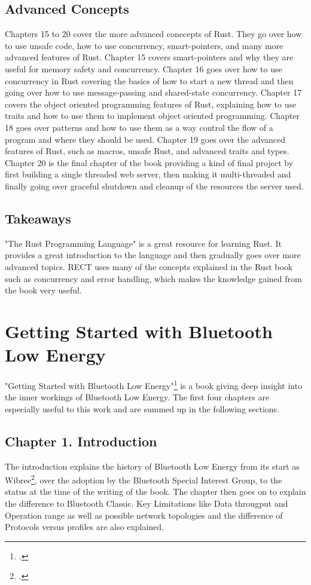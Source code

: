 \subsection{Advanced Concepts}
Chapters 15 to 20 cover the more advanced conecepts of Rust. They go over how to use unsafe code, how to use concurrency, smart-pointers, and many more advanced
features of Rust. Chapter 15 covers smart-pointers and why they are useful for memory safety and concurrency. Chapter 16 goes over how to use concurrency in Rust
covering the basics of how to start a new thread and then going over how to use message-passing and shared-state concurrency. Chapter 17 covers the object oriented
programming features of Rust, explaining how to use traits and how to use them to implement object oriented programming. Chapter 18 goes over patterns and how to use
them as a way control the flow of a program and where they should be used. Chapter 19 goes over the advanced features of Rust, such as macros, unsafe Rust, and advanced traits
and types. Chapter 20 is the final chapter of the book providing a kind of final project by first building a single threaded web server, then making it multi-threaded and 
finally going over graceful shutdown and cleanup of the resources the server used.  

\subsection{Takeaways}
"The Rust Programming Language" is a great resource for learning Rust. It provides a great introduction to the language and then gradually goes over more advanced topics.
RECT uses many of the concepts explained in the Rust book such as concurrency and error handling, which makes the knowledge gained from the book very useful.

\section{Getting Started with Bluetooth Low Energy}
"Getting Started with Bluetooth Low Energy"\footcite{ble-getting-started} is a book giving deep insight into
the inner workings of Bluetooth Low Energy. The first four chapters are especially useful to this
work and are summed up in the following sections.

\subsection{Chapter 1. Introduction}
The introduction explains the history of Bluetooth Low
Energy from its start as Wibree\footcite{wibree}, over the adoption by the Bluetooth Special Interest Group, to
the status at the time of the writing of the book. The chapter then goes on to explain the difference
to Bluetooth Classic. Key Limitations like Data througput and Operation range as well as possible network
topologies and the difference of Protocols versus profiles are also explained.  

